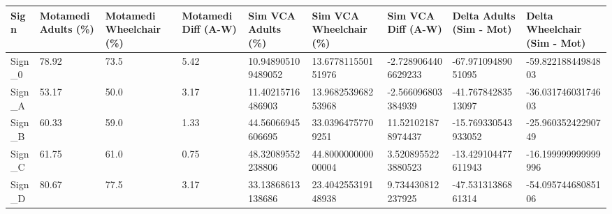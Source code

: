 \begin{tabular}{lllllllll}
\hline
Sign & Motamedi Adults (\%) & Motamedi Wheelchair (\%) & Motamedi Diff (A-W) & Sim VCA Adults (\%) & Sim VCA Wheelchair (\%) & Sim VCA Diff (A-W) & Delta Adults (Sim - Mot) & Delta Wheelchair (Sim - Mot) \\ \hline
Sign\_0 & 78.92 & 73.5 & 5.42 & 10.948905109489052 & 13.677811550151976 & -2.7289064406629233 & -67.97109489051095 & -59.82218844984803 \\
Sign\_A & 53.17 & 50.0 & 3.17 & 11.40215716486903 & 13.968253968253968 & -2.566096803384939 & -41.76784283513097 & -36.03174603174603 \\
Sign\_B & 60.33 & 59.0 & 1.33 & 44.56066945606695 & 33.03964757709251 & 11.521021878974437 & -15.769330543933052 & -25.96035242290749 \\
Sign\_C & 61.75 & 61.0 & 0.75 & 48.32089552238806 & 44.800000000000004 & 3.5208955223880523 & -13.429104477611943 & -16.199999999999996 \\
Sign\_D & 80.67 & 77.5 & 3.17 & 33.13868613138686 & 23.404255319148938 & 9.734430812237925 & -47.53131386861314 & -54.09574468085106 \\
\hline
\end{tabular}
